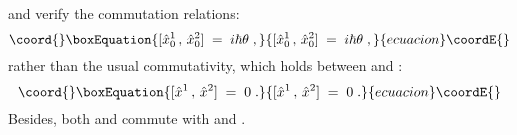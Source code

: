 \documentclass[a4paper,12pt]{article}
\begin{document}
and verify the commutation relations:
\begin{equation}\coord{}\boxEquation{
  \label{eq:cr0}
[ {\hat x}^1_0 \,,\, {\hat x}^2_0 ] \;=\; i \hbar \theta \;, 
}{
  [ {\hat x}^1_0 \,,\, {\hat x}^2_0 ] \;=\; i \hbar \theta \;, 
}{ecuacion}\coordE{}\end{equation}
rather than the usual commutativity, which holds between \coordHE{}
and \coordHE{}:
\begin{equation}\coord{}\boxEquation{
  \label{eq:cr1}
[ {\hat x}^1 \,,\, {\hat x}^2 ] \;=\; 0 \;. 
}{
  [ {\hat x}^1 \,,\, {\hat x}^2 ] \;=\; 0 \;. 
}{ecuacion}\coordE{}\end{equation}
Besides, both \coordHE{} and \coordHE{} commute with \coordHE{} and \coordHE{}.
\end{document}
